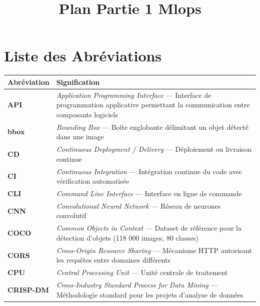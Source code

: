 \documentclass{rapportENSIAS}
\title{Plan Partie 1 Mlops }
\begin{document}
\jury{}

\fairemarges
\fairepagedegarde
\tableofcontents
\newpage

\chapter*{Liste des Abréviations}

\begin{table}[H]
\centering
\begin{tabular}{p{3.5cm} p{11cm}}
\toprule
\textbf{Abréviation} & \textbf{Signification} \\
\midrule
\textbf{API}      & \textit{Application Programming Interface} --- Interface de programmation applicative permettant la communication entre composants logiciels \\
\textbf{bbox}     & \textit{Bounding Box} --- Boîte englobante délimitant un objet détecté dans une image \\
\textbf{CD}       & \textit{Continuous Deployment / Delivery} --- Déploiement ou livraison continue \\
\textbf{CI}       & \textit{Continuous Integration} --- Intégration continue du code avec vérification automatisée \\
\textbf{CLI}      & \textit{Command Line Interface} --- Interface en ligne de commande \\
\textbf{CNN}      & \textit{Convolutional Neural Network} --- Réseau de neurones convolutif \\
\textbf{COCO}     & \textit{Common Objects in Context} --- Dataset de référence pour la détection d'objets (118 000 images, 80 classes) \\
\textbf{CORS}     & \textit{Cross-Origin Resource Sharing} --- Mécanisme HTTP autorisant les requêtes entre domaines différents \\
\textbf{CPU}      & \textit{Central Processing Unit} --- Unité centrale de traitement \\
\textbf{CRISP-DM} & \textit{Cross-Industry Standard Process for Data Mining} --- Méthodologie standard pour les projets d'analyse de données \\

\end{tabular}
\end{table}
\end{document}
